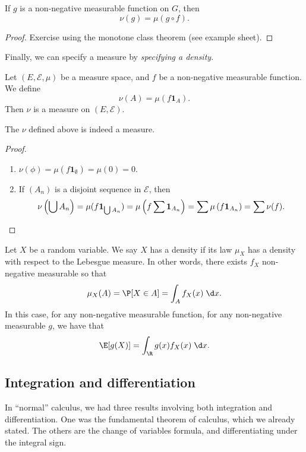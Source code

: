 \documentclass[a4paper]{article}
\begin{document}
\begin{prop}
  If $g$ is a non-negative measurable function on $G$, then
  \[
    \nu(g) = \mu(g \circ f).
  \]
\end{prop}

\begin{proof}
  Exercise using the monotone class theorem (see example sheet).
\end{proof}

Finally, we can specify a measure by \emph{specifying a density}.
\begin{defi}[Density]
  Let $(E, \mathcal{E}, \mu)$ be a measure space, and $f$ be a non-negative measurable function. We define
  \[
    \nu(A) = \mu(f \mathbf{1}_A)
  .\]
  Then $\nu$ is a measure on $(E, \mathcal{E})$.
\end{defi}

\begin{prop}
  The $\nu$ defined above is indeed a measure.
\end{prop}

\begin{proof}\leavevmode
  \begin{enumerate}
    \item $\nu(\phi) = \mu(f\mathbf{1}_\emptyset) = \mu(0) = 0$.
    \item If $(A_n)$ is a disjoint sequence in $\mathcal{E}$, then
      \[
        \nu\left(\bigcup A_n\right) = \mu(f\mathbf{1}_{\bigcup A_n}) = \mu\left(f \sum\mathbf{1}_{A_n}\right) = \sum \mu\left(f \mathbf{1}_{A_n}\right) = \sum \nu(f).\qedhere
      \]%
  \end{enumerate}
\end{proof}

\begin{defi}[Density]
  Let $X$ be a random variable. We say $X$ has a density if its law $\mu_X$ has a density with respect to the Lebesgue measure. In other words, there exists $f_X$ non-negative measurable so that
  \[
    \mu_X(A) = \P[X \in A] = \int_A f_X(x)\;\d x.
  \]
  In this case, for any non-negative measurable function, for any non-negative measurable $g$, we have that
  \[
    \E[g(X)] = \int_\R g(x) f_X(x) \;\d x.
  \]
\end{defi}

\subsection{Integration and differentiation}
In ``normal'' calculus, we had three results involving both integration and differentiation. One was the fundamental theorem of calculus, which we already stated. The others are the change of variables formula, and differentiating under the integral sign.
\end{document}

